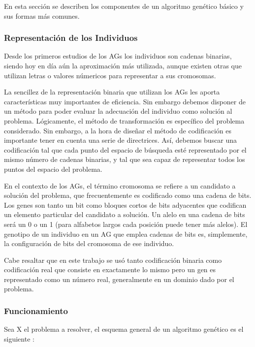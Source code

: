 \documentclass[runningheads]{llncs}
\begin{document}
En esta sección se describen los componentes de un algoritmo genético básico y sus formas más comunes.

\subsubsection{Representación de los Individuos}

Desde los primeros estudios de los AGs los individuos son cadenas binarias, siendo hoy en día aún la aproximación
más utilizada, aunque existen otras que utilizan letras o valores númericos para representar a sus cromosomas. 



La sencillez de la representación binaria que utilizan los AGs les aporta características muy importantes de eficiencia. 
Sin embargo debemos disponer de un método para poder evaluar la adecuación del individuo como solución al 
problema. Lógicamente, el método de transformación es específico del problema considerado. Sin embargo, a la hora de diseñar
el método de codificación es importante tener en cuenta una serie de directrices. Así, debemos buscar una codificación tal que
cada punto del espacio de búsqueda esté representado por el mismo número de cadenas binarias, y tal que sea capaz de representar
todos los puntos del espacio del problema. 

En el contexto de los AGs, el término cromosoma se refiere a un candidato a solución del problema, que frecuentemente es 
codificado como una cadena de bits. Los genes son tanto un bit como bloques cortos de bits adyacentes 
que codifican un elemento particular del candidato a solución. Un alelo en una cadena de bits será 
un 0 o un 1 (para alfabetos largos cada posición puede tener más alelos). El genotipo de un individuo en un AG que emplea
cadenas de bits es, simplemente, la configuración de bits del cromosoma de ese individuo. 

Cabe resaltar que en este trabajo se usó tanto codificación binaria como codificación real que
consiste en exactamente lo mismo pero un gen es representado como un número real, generalmente en un dominio dado por el 
problema. 


\subsubsection{Funcionamiento}

Sea X el problema a resolver, el esquema general de un algoritmo genético es el siguiente \cite{Her03}:
\end{document}
